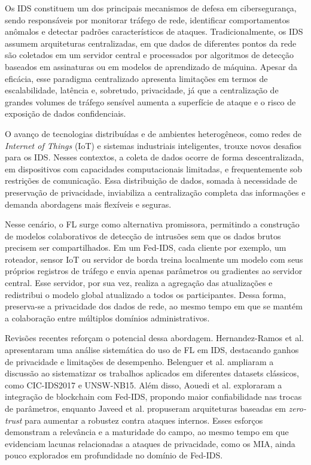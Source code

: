 \documentclass[
	12pt,				%
	openright,			%
	oneside,			%
	a4paper,			%
	english,			%
	french,				%
	spanish,			%
	brazil,				%
	]{abntex2}
\begin{document}
Os IDS constituem um dos principais mecanismos de defesa em cibersegurança, sendo responsáveis por monitorar tráfego de rede, identificar comportamentos anômalos e detectar padrões característicos de ataques. Tradicionalmente, os IDS assumem arquiteturas centralizadas, em que dados de diferentes pontos da rede são coletados em um servidor central e processados por algoritmos de detecção baseados em assinaturas ou em modelos de aprendizado de máquina. Apesar da eficácia, esse paradigma centralizado apresenta limitações em termos de escalabilidade, latência e, sobretudo, privacidade, já que a centralização de grandes volumes de tráfego sensível aumenta a superfície de ataque e o risco de exposição de dados confidenciais.

O avanço de tecnologias distribuídas e de ambientes heterogêneos, como redes de \textit{Internet of Things} (IoT) e sistemas industriais inteligentes, trouxe novos desafios para os IDS. Nesses contextos, a coleta de dados ocorre de forma descentralizada, em dispositivos com capacidades computacionais limitadas, e frequentemente sob restrições de comunicação. Essa distribuição de dados, somada à necessidade de preservação de privacidade, inviabiliza a centralização completa das informações e demanda abordagens mais flexíveis e seguras.

Nesse cenário, o FL surge como alternativa promissora, permitindo a construção de modelos colaborativos de detecção de intrusões sem que os dados brutos precisem ser compartilhados. Em um Fed-IDS, cada cliente  por exemplo, um roteador, sensor IoT ou servidor de borda  treina localmente um modelo com seus próprios registros de tráfego e envia apenas parâmetros ou gradientes ao servidor central. Esse servidor, por sua vez, realiza a agregação das atualizações e redistribui o modelo global atualizado a todos os participantes. Dessa forma, preserva-se a privacidade dos dados de rede, ao mesmo tempo em que se mantém a colaboração entre múltiplos domínios administrativos.

Revisões recentes reforçam o potencial dessa abordagem. Hernandez-Ramos et al. \cite{hernandez2023surveyfedids} apresentaram uma análise sistemática do uso de FL em IDS, destacando ganhos de privacidade e limitações de desempenho. Belenguer et al. \cite{belenguer2025surveyfedids} ampliaram a discussão ao sistematizar os trabalhos aplicados em diferentes datasets clássicos, como CIC-IDS2017 e UNSW-NB15. Além disso, Aouedi et al. \cite{aouedi2023blockchainids} exploraram a integração de blockchain com Fed-IDS, propondo maior confiabilidade nas trocas de parâmetros, enquanto Javeed et al. \cite{javeed2024zerotrust} propuseram arquiteturas baseadas em \textit{zero-trust} para aumentar a robustez contra ataques internos. Esses esforços demonstram a relevância e a maturidade do campo, ao mesmo tempo em que evidenciam lacunas relacionadas a ataques de privacidade, como os MIA, ainda pouco explorados em profundidade no domínio de Fed-IDS.
\end{document}
